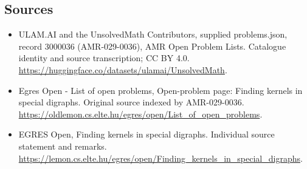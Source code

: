 \documentclass[11pt,a4paper]{article}
\begin{document}
\subsection{Sources}
\begin{itemize}
\item[S1] ULAM.AI and the UnsolvedMath Contributors, supplied problems.json, record 3000036 (AMR-029-0036), AMR Open Problem Lists. Catalogue identity and source transcription; CC BY 4.0.
\url{https://huggingface.co/datasets/ulamai/UnsolvedMath}.
\item[S2] Egres Open - List of open problems, Open-problem page: Finding kernels in special digraphs. Original source indexed by AMR-029-0036.
\url{https://oldlemon.cs.elte.hu/egres/open/List_of_open_problems}.
\item[S3] EGRES Open, Finding kernels in special digraphs. Individual source statement and remarks.
\url{https://lemon.cs.elte.hu/egres/open/Finding_kernels_in_special_digraphs}.
\end{itemize}
\end{document}
